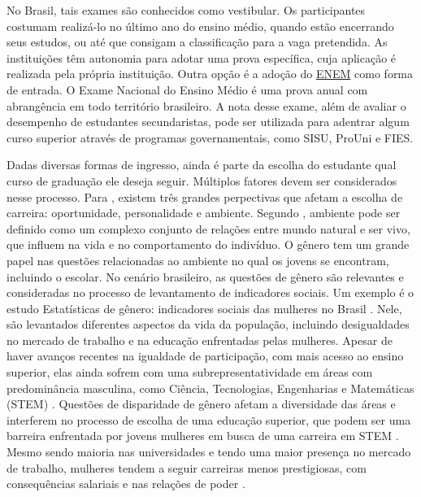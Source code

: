 No Brasil, tais exames são conhecidos como vestibular. Os participantes costumam realizá-lo no último ano do ensino médio, quando estão encerrando seus estudos, ou até que consigam a classificação para a vaga pretendida. As instituições têm autonomia para adotar uma prova específica, cuja aplicação é realizada pela própria instituição. Outra opção é a adoção do \href{https://www.gov.br/inep/pt-br/areas-de-atuacao/avaliacao-e-exames-educacionais/enem}{ENEM} como forma de entrada. O Exame Nacional do Ensino Médio é uma prova anual com abrangência em todo território brasileiro. A nota desse exame, além de avaliar o desempenho de estudantes secundaristas, pode ser utilizada para adentrar algum curso superior através de programas governamentais, como SISU, ProUni e FIES.

Dadas diversas formas de ingresso, ainda é parte da escolha do estudante qual curso de graduação ele deseja seguir. Múltiplos fatores devem ser considerados nesse processo. Para \citet{Borchert2001}, existem três grandes perpectivas que afetam a escolha de carreira: oportunidade, personalidade e ambiente. Segundo \citet{Abbagnano2012}, ambiente pode ser definido como um complexo conjunto de relações entre mundo natural e ser vivo, que influem na vida e no comportamento do indivíduo. O gênero tem um grande papel nas questões relacionadas ao ambiente no qual os jovens se encontram, incluindo o escolar. No cenário brasileiro, as questões de gênero são relevantes e consideradas no processo de levantamento de indicadores sociais. Um exemplo é o estudo Estatísticas de gênero: indicadores sociais das mulheres no Brasil \autocite{ibge}. Nele, são levantados diferentes aspectos da vida da população, incluindo desigualdades no mercado de trabalho e na educação enfrentadas pelas mulheres. Apesar de haver avanços recentes na igualdade de participação, com mais acesso ao ensino superior, elas ainda sofrem com uma subrepresentatividade em áreas com predominância masculina, como Ciência, Tecnologias, Engenharias e Matemáticas (STEM) \autocite{Saavedra2010}. Questões de disparidade de gênero afetam a diversidade das áreas e interferem no processo de escolha de uma educação superior, que podem ser uma barreira enfrentada por jovens mulheres em busca de uma carreira em STEM \autocite{VerdugoCastro2022}. Mesmo sendo maioria nas universidades e tendo uma maior presença no mercado de trabalho, mulheres tendem a seguir carreiras menos prestigiosas, com consequências salariais e nas relações de poder \autocite{Senkevics2021}. 

